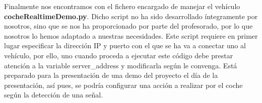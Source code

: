 Finalmente nos encontramos con el fichero encargado de manejar el vehículo \textbf{cocheRealtimeDemo.py}. Dicho script no ha sido desarrollado íntegramente por nosotros, sino que se nos ha proporcionado por parte del profesorado, por lo que nosotros lo hemos adaptado a nuestras necesidades. Este script requiere en primer lugar especificar la dirección IP y puerto con el que se ha va a conectar uno al vehículo, por ello, uno cuando proceda a ejecutar este código debe prestar atención a la variable server_address y modificarla según le convenga. Está preparado para la presentación de una demo del proyecto el día de la presentación, así pues, se podría configurar una acción a realizar por el coche según la detección de una señal.
